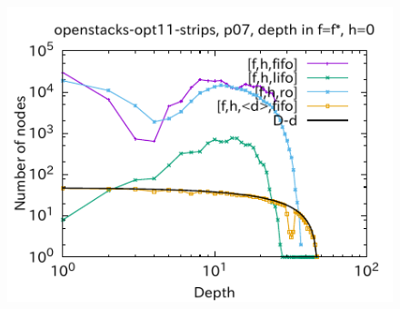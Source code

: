 \begin{figure}[htbp]
\begin{center}
\includegraphics{img/output-lmcut/openstacks-opt11-strips/p07-0.pdf}
\end{center}


\end{figure}
